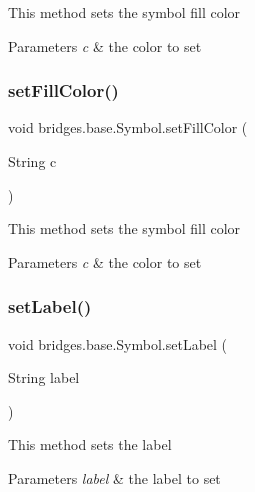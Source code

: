 This method sets the symbol fill color


\begin{DoxyParams}{Parameters}
{\em c} & the color to set \\
\hline
\end{DoxyParams}
\mbox{\label{classbridges_1_1base_1_1_symbol_a3a2c48d9707ff3fa7a832e77b679b1b9}} 
\subsubsection{\texorpdfstring{set\+Fill\+Color()}{setFillColor()}\hspace{0.1cm}{\footnotesize\ttfamily [2/2]}}
{\footnotesize\ttfamily void bridges.\+base.\+Symbol.\+set\+Fill\+Color (\begin{DoxyParamCaption}\item[{String}]{c }\end{DoxyParamCaption})}

This method sets the symbol fill color


\begin{DoxyParams}{Parameters}
{\em c} & the color to set \\
\hline
\end{DoxyParams}
\mbox{\label{classbridges_1_1base_1_1_symbol_af6b944374cbd34334caac28d948a3f21}} 
\subsubsection{\texorpdfstring{set\+Label()}{setLabel()}}
{\footnotesize\ttfamily void bridges.\+base.\+Symbol.\+set\+Label (\begin{DoxyParamCaption}\item[{String}]{label }\end{DoxyParamCaption})}

This method sets the label


\begin{DoxyParams}{Parameters}
{\em label} & the label to set \\
\hline
\end{DoxyParams}
\mbox{\label{classbridges_1_1base_1_1_symbol_a168cea9fd50ad311fe9c74215ab708ac}} 
